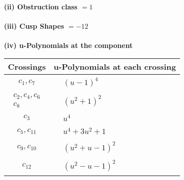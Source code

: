 \documentclass[1p]{elsarticle_modified}
\theoremstyle{definition}
\begin{document}
\flushleft \textbf{(ii) Obstruction class $= 1$}\\~\\
\flushleft \textbf{(iii) Cusp Shapes $= -12$}\\~\\
\newpage\renewcommand{\arraystretch}{1}
\flushleft \textbf{(iv) u-Polynomials at the component}\newline \\
\begin{tabular}{m{50pt}|m{274pt}}
Crossings & \hspace{64pt}u-Polynomials at each crossing \\
\hline $$\begin{aligned}c_{1},c_{7}\end{aligned}$$&$\begin{aligned}
&(u-1)^4
\end{aligned}$\\
\hline $$\begin{aligned}c_{2},c_{4},c_{6}\\c_{8}\end{aligned}$$&$\begin{aligned}
&(u^2+1)^2
\end{aligned}$\\
\hline $$\begin{aligned}c_{3}\end{aligned}$$&$\begin{aligned}
&u^4
\end{aligned}$\\
\hline $$\begin{aligned}c_{5},c_{11}\end{aligned}$$&$\begin{aligned}
&u^4+3 u^2+1
\end{aligned}$\\
\hline $$\begin{aligned}c_{9},c_{10}\end{aligned}$$&$\begin{aligned}
&(u^2+u-1)^2
\end{aligned}$\\
\hline $$\begin{aligned}c_{12}\end{aligned}$$&$\begin{aligned}
&(u^2- u-1)^2
\end{aligned}$\\
\hline
\end{tabular}\\~\\
\end{document}
